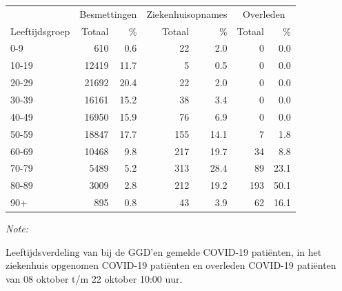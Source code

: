 \documentclass[
  english,
  man,floatsintext]{apa6}
\begin{document}
\begin{table}[H]
\centering\begingroup\fontsize{11}{13}\selectfont

\begin{threeparttable}
\begin{tabular}{lrrrrrr}
\toprule
\multicolumn{1}{c}{ } & \multicolumn{2}{c}{Besmettingen} & \multicolumn{2}{c}{Ziekenhuisopnames} & \multicolumn{2}{c}{Overleden} \\
\cmidrule(l{3pt}r{3pt}){2-3} \cmidrule(l{3pt}r{3pt}){4-5} \cmidrule(l{3pt}r{3pt}){6-7}
Leeftijdsgroep & Totaal & \% & Totaal & \% & Totaal & \%\\
\midrule
0-9 & 610 & 0.6 & 22 & 2.0 & 0 & 0.0\\
10-19 & 12419 & 11.7 & 5 & 0.5 & 0 & 0.0\\
20-29 & 21692 & 20.4 & 22 & 2.0 & 0 & 0.0\\
30-39 & 16161 & 15.2 & 38 & 3.4 & 0 & 0.0\\
40-49 & 16950 & 15.9 & 76 & 6.9 & 0 & 0.0\\
50-59 & 18847 & 17.7 & 155 & 14.1 & 7 & 1.8\\
60-69 & 10468 & 9.8 & 217 & 19.7 & 34 & 8.8\\
70-79 & 5489 & 5.2 & 313 & 28.4 & 89 & 23.1\\
80-89 & 3009 & 2.8 & 212 & 19.2 & 193 & 50.1\\
90+ & 895 & 0.8 & 43 & 3.9 & 62 & 16.1\\
\bottomrule
\end{tabular}
\begin{tablenotes}
\item \textit{Note: } 
\item Leeftijdsverdeling van bij de GGD’en gemelde COVID-19 patiënten, in het ziekenhuis opgenomen COVID-19 patiënten en overleden COVID-19 patiënten van 08 oktober t/m 22 oktober 10:00 uur.
\end{tablenotes}
\end{threeparttable}
\endgroup{}
\end{table}
\end{document}
